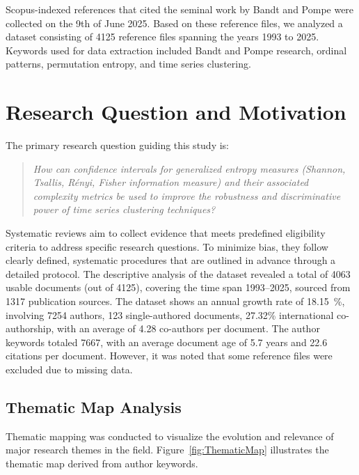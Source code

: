 Scopus-indexed references that cited the seminal work by Bandt and Pompe were collected on the 9th of June 2025. 
Based on these reference files, we analyzed a dataset consisting of 4125 reference files spanning the years 1993 to 2025. %
Keywords used for data extraction included Bandt and Pompe research, ordinal patterns, permutation entropy, and time series clustering. 

\section{Research Question and Motivation}

The primary research question guiding this study is:
\begin{quote}
\textit{How can confidence intervals for generalized entropy measures (Shannon, Tsallis, Rényi, Fisher information measure) and their associated complexity metrics be used to improve the robustness and discriminative power of time series clustering techniques?}
\end{quote}

Systematic reviews aim to collect evidence that meets predefined eligibility criteria to address specific research questions. 
To minimize bias, they follow clearly defined, systematic procedures that are outlined in advance through a detailed protocol. The descriptive analysis of the dataset revealed a total of 4063 usable documents (out of 4125), covering the time span 1993–2025, sourced from 1317 publication sources. 
The dataset shows an annual growth rate of \SI{18.15}{\percent}, involving 7254 authors, 123 single-authored documents, 27.32\% international co-authorship, with an average of 4.28 co-authors per document. 
The author keywords totaled 7667, with an average document age of 5.7 years and 22.6 citations per document. However, it was noted that some reference files were excluded due to missing data.

\subsection{Thematic Map Analysis}

Thematic mapping was conducted to visualize the evolution and relevance of major research themes in the field. 
Figure~\ref{fig:ThematicMap} illustrates the thematic map derived from author keywords.


